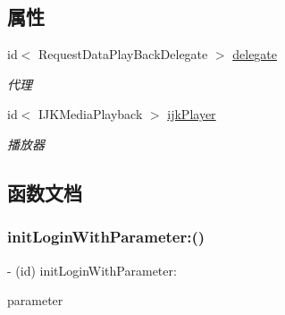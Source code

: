 \subsection*{属性}
\begin{DoxyCompactItemize}
\item 
\mbox{\label{interface_request_data_play_back_a34e93b0b082e759a428100c7db4ab02b}} 
id$<$ Request\+Data\+Play\+Back\+Delegate $>$ \hyperlink{interface_request_data_play_back_a34e93b0b082e759a428100c7db4ab02b}{delegate}
\begin{DoxyCompactList}\small\item\em 代理 \end{DoxyCompactList}\item 
\mbox{\label{interface_request_data_play_back_a0e6abb5302bad21cdefb2f41dd183bd3}} 
id$<$ I\+J\+K\+Media\+Playback $>$ \hyperlink{interface_request_data_play_back_a0e6abb5302bad21cdefb2f41dd183bd3}{ijk\+Player}
\begin{DoxyCompactList}\small\item\em 播放器 \end{DoxyCompactList}\end{DoxyCompactItemize}


\subsection{函数文档}
\mbox{\label{interface_request_data_play_back_a7684c4a40fb878031fdfb0eff0633316}} 
\subsubsection{\texorpdfstring{init\+Login\+With\+Parameter\+:()}{initLoginWithParameter:()}}
{\footnotesize\ttfamily -\/ (id) init\+Login\+With\+Parameter\+: \begin{DoxyParamCaption}\item[{(\hyperlink{interface_play_parameter}{Play\+Parameter} $\ast$)}]{parameter }\end{DoxyParamCaption}}



